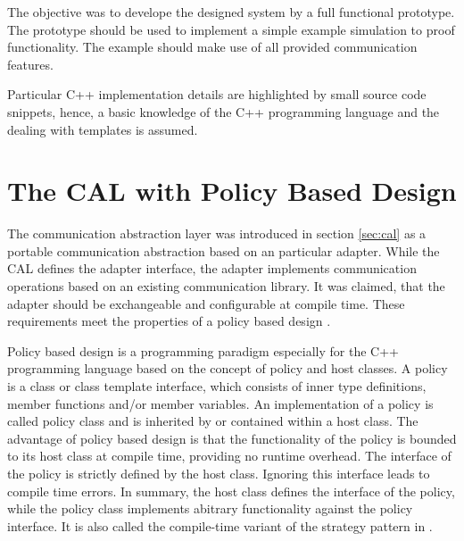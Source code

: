The objective was to develope the designed system by a full functional prototype.
The prototype should be used to implement a simple example simulation
to proof functionality. The example should make use of all provided
communication features.

Particular C++ implementation details are highlighted by small source
code snippets, hence, a basic knowledge of the C++ programming
language and the dealing with templates is assumed.

\section{The CAL with Policy Based Design}

The communication abstraction layer was introduced in section
\ref{sec:cal} as a portable communication abstraction based on an
particular adapter. While the CAL defines the adapter interface, the adapter
implements communication operations based on an existing communication
library.  It was claimed, that the adapter should be exchangeable and
configurable at compile time. These requirements meet the properties of
a policy based design \cite{ref:policy_based_design}.

Policy based design is a programming paradigm especially for the C++
programming language based on the concept of policy and host classes.
A policy is a class or class template interface, which consists of
inner type definitions, member functions and/or member variables. An
implementation of a policy is called policy class and is inherited by
or contained within a host class.  The advantage of policy based
design is that the functionality of the policy is bounded to its host
class at compile time, providing no runtime overhead.  The interface
of the policy is strictly defined by the host class. Ignoring this
interface leads to compile time errors. In summary, the host class
defines the interface of the policy, while the policy class implements
abitrary functionality against the policy interface. It is also called
the compile-time variant of the strategy pattern in
\cite{ref:policy_strategy}.

